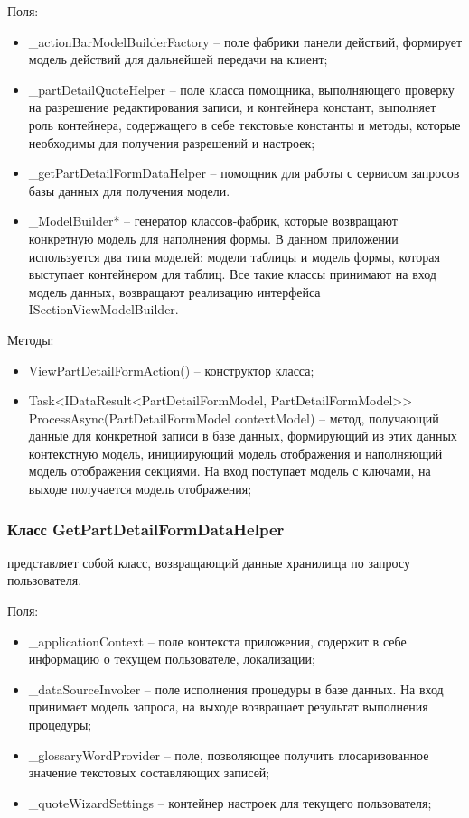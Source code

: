 Поля:
\begin{itemize}
  \item \_actionBarModelBuilderFactory – поле фабрики панели действий, формирует модель действий для дальнейшей передачи на клиент;
  \item \_partDetailQuoteHelper – поле класса помощника, выполняющего проверку на разрешение редактирования записи, и контейнера констант, выполняет роль контейнера, содержащего в себе текстовые константы и методы, которые необходимы для получения разрешений и настроек;
  \item \_getPartDetailFormDataHelper – помощник для работы с сервисом запросов базы данных для получения модели.
  \item \_ModelBuilder* – генератор классов-фабрик, которые возвращают конкретную модель для наполнения формы. В данном приложении используется два типа моделей: модели таблицы и модель формы, которая выступает контейнером для таблиц. Все такие классы принимают на вход модель данных, возвращают реализацию интерфейса ISectionViewModelBuilder.
\end{itemize}

Методы:
\begin{itemize}
  \item ViewPartDetailFormAction() – конструктор класса;
  \item Task<IDataResult<PartDetailFormModel, PartDetailFormModel>> \foreignlanguage{english}{ProcessAsync(PartDetailFormModel contextModel)} – метод, получающий данные для конкретной записи в базе данных, формирующий из этих данных контекстную модель, инициирующий модель отображения и наполняющий модель отображения секциями. На вход поступает модель с ключами, на выходе получается модель отображения;
\end{itemize}

\subsubsection{Класс GetPartDetailFormDataHelper }
\label{sub:arch_and_mod:data_layer:view_part_detail}

представляет собой класс, возвращающий данные хранилища по запросу пользователя.

Поля:
\begin{itemize}
  \item \_applicationContext – поле контекста приложения, содержит в себе информацию о текущем пользователе, локализации;
  \item \_dataSourceInvoker – поле исполнения процедуры в базе данных. На вход принимает модель запроса, на выходе возвращает результат выполнения процедуры;
  \item \_glossaryWordProvider – поле, позволяющее получить глосаризованное значение текстовых составляющих записей;
  \item \_quoteWizardSettings – контейнер настроек для текущего пользователя;
\end{itemize}


